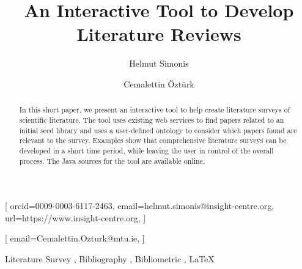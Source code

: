 \documentclass[
 hf]{ceurart}
\begin{document}


\title{An Interactive Tool to Develop Literature Reviews}


\author[1]{Helmut Simonis}[%
orcid=0009-0003-6117-2463,
email=helmut.simonis@insight-centre.org,
url=https://www.insight-centre.org,
]
\address[1]{Insight SFI Centre for Data Analytics, Department for Computer Science and Information Technology, University College Cork, Cork, Ireland}

\author[2]{Cemalettin Öztürk}[%
email=Cemalettin.Ozturk@mtu.ie,
]
\address[2]{Munster Technological University, Bishopstown, Cork, Ireland}


\begin{abstract}
In this short paper, we present an interactive tool to help create literature surveys of scientific literature. The tool uses existing web services to find papers related to an initial seed library and uses a user-defined ontology to consider which papers found are relevant to the survey. Examples show that comprehensive literature surveys can be developed in a short time period, while leaving the user in control of the overall process. The Java sources for the tool are available online. 
\end{abstract}

\begin{keywords}
  Literature Survey \sep
  Bibliography \sep
  Bibliometric \sep
  LaTeX
\end{keywords}

\maketitle
\end{document}
